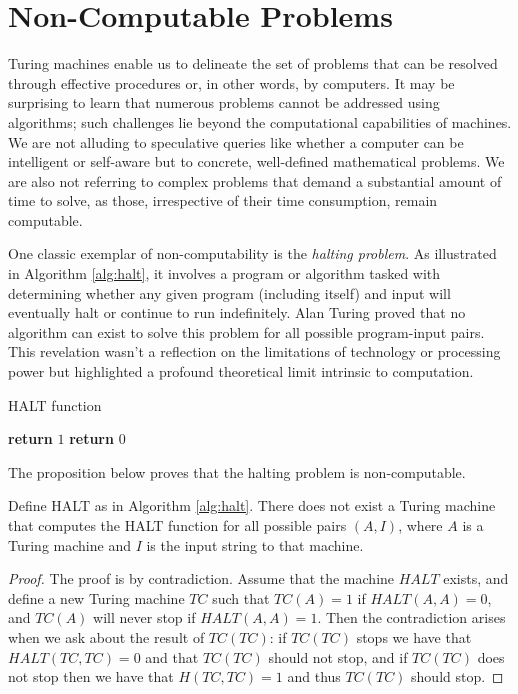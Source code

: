 %
%

\section{Non-Computable Problems}
\label{sec:non_computable_problems}

Turing machines enable us to delineate the set of problems that can be resolved through effective procedures or, in other words, by computers. It may be surprising to learn that numerous problems cannot be addressed using algorithms; such challenges lie beyond the computational capabilities of machines. We are not alluding to speculative queries like whether a computer can be intelligent or self-aware but to concrete, well-defined mathematical problems. We are also not referring to complex problems that demand a substantial amount of time to solve, as those, irrespective of their time consumption, remain computable.

One classic exemplar of non-computability is the \emph{halting problem}. As illustrated in Algorithm \ref{alg:halt}, it involves a program or algorithm tasked with determining whether any given program (including itself) and input will eventually halt or continue to run indefinitely. Alan Turing proved that no algorithm can exist to solve this problem for all possible program-input pairs. This revelation wasn't a reflection on the limitations of technology or processing power but highlighted a profound theoretical limit intrinsic to computation.

\begin{algorithm}
\caption{HALT function}
\label{alg:halt}
\begin{algorithmic}
        \State \textbf{return} $1$
    \Else
        \State \textbf{return} $0$
    \EndIf
\EndProcedure
\end{algorithmic}
\end{algorithm}

The proposition below proves that the halting problem is non-computable.

\begin{proposition}
\label{th:halting-problem}
Define HALT as in Algorithm \ref{alg:halt}. There does not exist a Turing machine that computes the HALT function for all possible pairs $(A, I)$, where $A$ is a Turing machine and $I$ is the input string to that machine.
\end{proposition}
\begin{proof}
The proof is by contradiction. Assume that the machine $HALT$  exists, and define a new Turing machine $TC$ such that $TC(A) = 1$ if $HALT(A,A) = 0$, and $TC(A)$ will never stop if $HALT(A,A) = 1$. Then the contradiction arises when we ask about the result of $TC(TC)$: if $TC(TC)$ stops we have that $HALT(TC,TC) = 0$ and that $TC(TC)$ should not stop, and if $TC(TC)$ does not stop then we have that $H(TC,TC) = 1$ and thus $TC(TC)$ should stop.
\end{proof}

